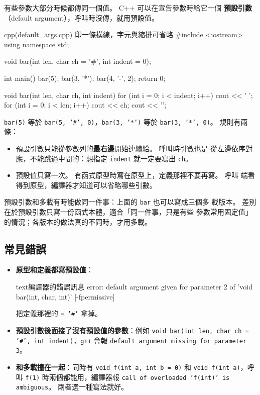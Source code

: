 有些參數大部分時候都傳同一個值。 C++ 可以在宣告參數時給它一個
\textbf{預設引數}（default argument），呼叫時沒傳，就用預設值。

\begin{example}[label=ex:default-args]{cpp}{(default\_args.cpp) 印一條橫線，字元與縮排可省略}
#include <iostream>
using namespace std;

void bar(int len, char ch = '#', int indent = 0);

int main() {
    bar(5);
    bar(3, '*');
    bar(4, '-', 2);
    return 0;
}

void bar(int len, char ch, int indent) {
    for (int i = 0; i < indent; i++) {
        cout << ' ';
    }
    for (int i = 0; i < len; i++) {
        cout << ch;
    }
    cout << '\n';
}
\end{example}

\iosample{}{
\#\#\#\#\# \\
*** \\
\ \ ---- \\
}

\texttt{bar(5)} 等於 \texttt{bar(5, '\#', 0)}，\texttt{bar(3, '*')}
等於 \texttt{bar(3, '*', 0)}。 規則有兩條：

\begin{itemize}
\item 預設引數只能從參數列的\textbf{最右邊}開始連續給。 呼叫時引數也是
從左邊依序對應，不能跳過中間的：想指定 \texttt{indent} 就一定要寫出
\texttt{ch}。
\item 預設值只寫一次。 有函式原型時寫在原型上，定義那裡不要再寫。 呼叫
端看得到原型，編譯器才知道可以省略哪些引數。
\end{itemize}

預設引數和多載有時能做同一件事：上面的 \texttt{bar} 也可以寫成三個多
載版本。 差別在於預設引數只寫一份函式本體，適合「同一件事，只是有些
參數常用固定值」的情況；各版本的做法真的不同時，才用多載。

\subsection{常見錯誤}

\begin{itemize}
\item \textbf{原型和定義都寫預設值}：
\begin{code}{text}{編譯器的錯誤訊息}
error: default argument given for parameter 2 of 'void bar(int, char, int)' [-fpermissive]
\end{code}
把定義那裡的 \texttt{= '\#'} 拿掉。
\item \textbf{預設引數後面接了沒有預設值的參數}：例如
\texttt{void bar(int len, char ch = '\#', int indent)}，\texttt{g++}
會報 \texttt{default argument missing for parameter 3}。
\item \textbf{和多載撞在一起}：同時有 \texttt{void f(int a, int b = 0)}
和 \texttt{void f(int a)}，呼叫 \texttt{f(1)} 時兩個都能用，編譯器報
\texttt{call of overloaded 'f(int)' is ambiguous}。 兩者選一種寫法就好。
\end{itemize}

